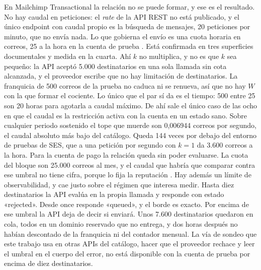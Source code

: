 En Mailchimp Transactional la relación no se puede formar, y ese es el resultado.
No hay caudal en peticiones: el \textit{rate} de la API REST no está publicado, y el único endpoint con caudal propio es la búsqueda de mensajes, 20 peticiones por minuto, que no envía nada.
Lo que gobierna el envío es una cuota horaria en correos, 25 a la hora en la cuenta de prueba \citep{mailchimpdocs}.
Está confirmada en tres superficies documentales y medida en la cuarta.
Ahí $k$ no multiplica, y no es que $k$ sea pequeño: la API aceptó 5.000 destinatarios en una sola llamada sin cota alcanzada, y el proveedor escribe que no hay limitación de destinatarios.
La franquicia de 500 correos de la prueba no caduca ni se renueva, así que no hay $W$ con la que formar el cociente.
Lo único que el par sí da es el tiempo: 500 entre 25 son 20 horas para agotarla a caudal máximo.
De ahí sale el único caso de las ocho en que el caudal es la restricción activa con la cuenta en un estado sano.
Sobre cualquier periodo sostenido el tope que muerde son 0,006944 correos por segundo, el caudal absoluto más bajo del catálogo.
Queda 144 veces por debajo del entorno de pruebas de SES, que a una petición por segundo con $k = 1$ da 3.600 correos a la hora.
Para la cuenta de pago la relación queda sin poder evaluarse.
La cuota del bloque son 25.000 correos al mes, y el caudal que habría que comparar contra ese umbral no tiene cifra, porque lo fija la reputación \citep{mailchimppricing}.
Hay además un límite de observabilidad, y cae justo sobre el régimen que interesa medir.
Hasta diez destinatarios la API evalúa en la propia llamada y responde con estado «rejected».
Desde once responde «queued», y el borde es exacto.
Por encima de ese umbral la API deja de decir si enviará. Unos 7.600 destinatarios quedaron en cola, todos en un dominio reservado que no entrega, y dos horas después no habían descontado de la franquicia ni del contador mensual.
La vía de sondeo que este trabajo usa en otras APIs del catálogo, hacer que el proveedor rechace y leer el umbral en el cuerpo del error, no está disponible con la cuenta de prueba por encima de diez destinatarios.

